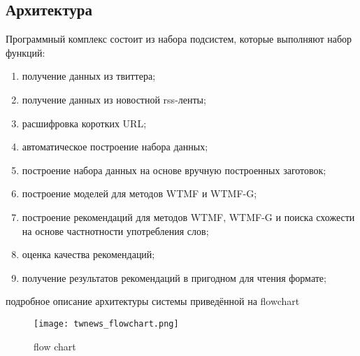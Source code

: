 \subsection{Архитектура}
    Программный комплекс состоит из набора подсистем, которые выполняют набор функций:
    \begin{enumerate}
        \item получение данных из твиттера;
        \item получение данных из новостной rss-ленты;
        \item расшифровка коротких URL;
        \item автоматическое построение набора данных;
        \item построение набора данных на основе вручную построенных заготовок;
        \item построение моделей для методов WTMF и WTMF-G;
        \item построение рекомендаций для методов WTMF, WTMF-G и поиска схожести на основе частнотности употребления слов;
        \item оценка качества рекомендаций;
        \item получение результатов рекомендаций в пригодном для чтения формате;
    \end{enumerate}

    подробное описание архитектуры системы приведённой на flowchart

    \begin{sidewaysfigure}[h!]
            \center
            \texttt{[image: twnews\_flowchart.png]}
            \caption{flow chart}
            \label{pic:flowchart}
    \end{sidewaysfigure}

    \clearpage



